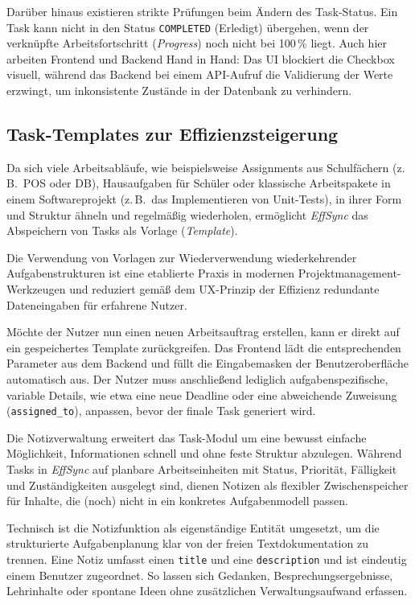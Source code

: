 Darüber hinaus existieren strikte Prüfungen beim Ändern des Task-Status. Ein Task kann nicht in den Status \texttt{COMPLETED} (Erledigt) übergehen, wenn der verknüpfte Arbeitsfortschritt (\textit{Progress}) noch nicht bei 100\,\% liegt. Auch hier arbeiten Frontend und Backend Hand in Hand: Das UI blockiert die Checkbox visuell, während das Backend bei einem API-Aufruf die Validierung der Werte erzwingt, um inkonsistente Zustände in der Datenbank zu verhindern.

\subsection{Task-Templates zur Effizienzsteigerung}
Da sich viele Arbeitsabläufe, wie beispielsweise Assignments aus Schulfächern (z.\,B.\ POS oder DB), Hausaufgaben für Schüler oder klassische Arbeitspakete in einem Softwareprojekt (z.\,B.\ das Implementieren von Unit-Tests), in ihrer Form und Struktur ähneln und regelmäßig wiederholen, ermöglicht \textit{EffSync} das Abspeichern von Tasks als Vorlage (\textit{Template}). 

Die Verwendung von Vorlagen zur Wiederverwendung wiederkehrender Aufgabenstrukturen ist eine etablierte Praxis in modernen Projektmanagement-Werkzeugen \cite{nielsen_heuristics} und reduziert gemäß dem UX-Prinzip der Effizienz redundante Dateneingaben für erfahrene Nutzer.

Möchte der Nutzer nun einen neuen Arbeitsauftrag erstellen, kann er direkt auf ein gespeichertes Template zurückgreifen. Das Frontend lädt die entsprechenden Parameter aus dem Backend und füllt die Eingabemasken der Benutzeroberfläche automatisch aus. Der Nutzer muss anschließend lediglich aufgabenspezifische, variable Details, wie etwa eine neue Deadline oder eine abweichende Zuweisung (\texttt{assigned\_to}), anpassen, bevor der finale Task generiert wird.

\label{sec:notizverwaltung}
Die Notizverwaltung erweitert das Task-Modul um eine bewusst einfache Möglichkeit, Informationen schnell und ohne feste Struktur abzulegen. Während Tasks in \textit{EffSync} auf planbare Arbeitseinheiten mit Status, Priorität, Fälligkeit und Zuständigkeiten ausgelegt sind, dienen Notizen als flexibler Zwischenspeicher für Inhalte, die (noch) nicht in ein konkretes Aufgabenmodell passen.

Technisch ist die Notizfunktion als eigenständige Entität umgesetzt, um die strukturierte Aufgabenplanung klar von der freien Textdokumentation zu trennen. Eine Notiz umfasst einen \texttt{title} und eine \texttt{description} und ist eindeutig einem Benutzer zugeordnet. So lassen sich Gedanken, Besprechungsergebnisse, Lehrinhalte oder spontane Ideen ohne zusätzlichen Verwaltungsaufwand erfassen.

